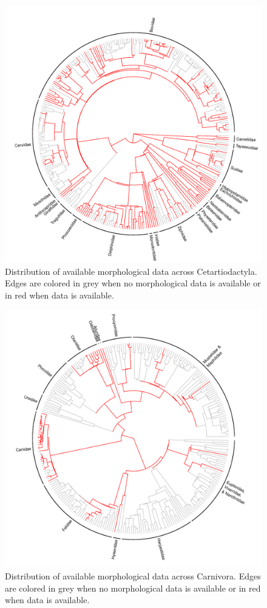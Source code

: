 \documentclass[12pt,letterpaper]{article}
\begin{document}
\begin{figure}[!htbp]
\centering
    \includegraphics[width=1\textwidth]{example_coverageA.pdf}
\caption{Distribution of available morphological data across Cetartiodactyla.
Edges are colored in grey when no morphological data is available or in red when data is available.}
\label{Figure_example_coverageA}
\end{figure}

\begin{figure}[!htbp]
\centering
    \includegraphics[width=1\textwidth]{example_coverageB.pdf}
\caption{Distribution of available morphological data across Carnivora.
Edges are colored in grey when no morphological data is available or in red when data is available.}
\label{Figure_example_coverageB}
\end{figure}
\end{document}
